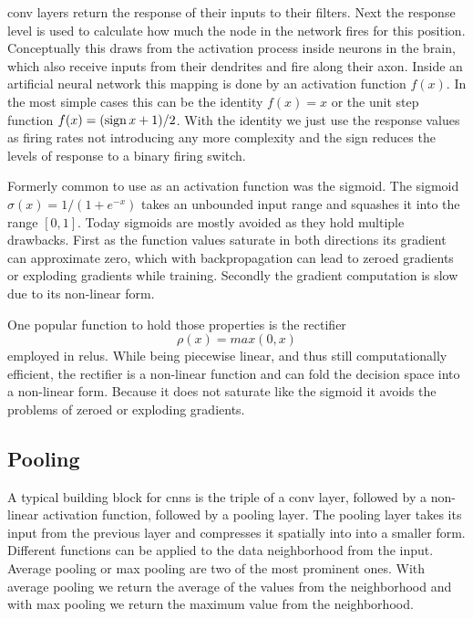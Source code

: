 \gls{conv} layers return the response of their inputs to their filters. Next the response level is used to calculate how much the node in the network fires for this position. Conceptually this draws from the activation process inside neurons in the brain, which also receive inputs from their dendrites and fire along their axon. Inside an artificial neural network this mapping is done by an activation function $f(x)$. In the most simple cases this can be the identity $f(x) = x$ or the unit step function $f(x) = (\operatorname{sign} x + 1) / 2$. With the identity we just use the response values as firing rates not introducing any more complexity and the sign reduces the levels of response to a binary firing switch.

Formerly common to use as an activation function was the sigmoid. The sigmoid $\sigma(x) = 1/(1+e^{-x})$  takes an unbounded input range and squashes it into the range $[0, 1]$. Today sigmoids are mostly avoided as they hold multiple drawbacks. First as the function values saturate in both directions its gradient can approximate zero, which with backpropagation can lead to zeroed gradients or exploding gradients while training. Secondly the gradient computation is slow due to its non-linear form.

One popular function to hold those properties is the rectifier 
\begin{equation}
    \rho(x) = max(0, x)
\end{equation}
employed in \glspl{relu}. While being piecewise linear, and thus still computationally efficient, the rectifier is a non-linear function and can fold the decision space into a non-linear form. Because it does not saturate like the sigmoid it avoids the problems of zeroed or exploding gradients.

\subsection{Pooling}
\label{sub:concepts:nn:pooling}
A typical building block for \glspl{cnn} is the triple of a \gls{conv} layer, followed by a non-linear activation function, followed by a pooling layer. The pooling layer takes its input from the previous layer and compresses it spatially into into a smaller form. Different functions can be applied to the data neighborhood from the input. Average pooling \citep{lecun_handwritten_1990} or max pooling \citep{zhou_computation_1988} are two of the most prominent ones. With average pooling we return the average of the values from the neighborhood and with max pooling we return the maximum value from the neighborhood.

